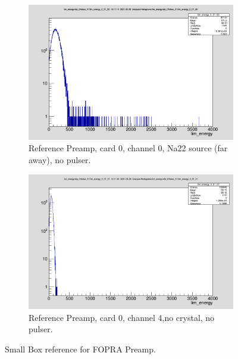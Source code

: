 \documentclass{report}
\begin{document}
\begin{figure}[!htb]
  \centering
  \begin{subfigure}[b]{0.45\textwidth}
    \includegraphics[width=\linewidth]{fopra_preamp_ref_ch0.png}
	  \caption{Reference Preamp, card 0, channel 0, Na22 source (far away), no pulser.}
  \end{subfigure}
  \begin{subfigure}[b]{0.4\textwidth}
    \includegraphics[width=\linewidth]{fopra_preamp_ref_ch1_no_crystal.png}
    \caption{Reference Preamp, card 0, channel 4,no crystal, no pulser.}
  \end{subfigure}
  \caption{Small Box reference for FOPRA Preamp.}
\end{figure}

\newpage
\clearpage
\end{document}
